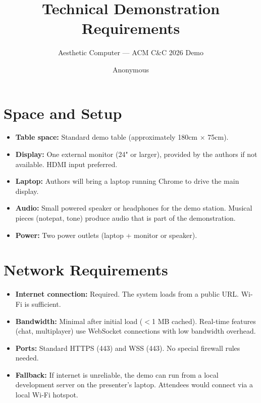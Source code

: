 \documentclass[manuscript,anonymous,review]{acmart}
\begin{document}
\title{Technical Demonstration Requirements}
\subtitle{Aesthetic Computer --- ACM C\&C 2026 Demo}

\author{Anonymous}

\maketitle

\section{Space and Setup}

\begin{itemize}
  \item \textbf{Table space:} Standard demo table (approximately 180cm $\times$ 75cm).
  \item \textbf{Display:} One external monitor (24" or larger), provided by the authors if not available. HDMI input preferred.
  \item \textbf{Laptop:} Authors will bring a laptop running Chrome to drive the main display.
  \item \textbf{Audio:} Small powered speaker or headphones for the demo station. Musical pieces (notepat, tone) produce audio that is part of the demonstration.
  \item \textbf{Power:} Two power outlets (laptop + monitor or speaker).
\end{itemize}

\section{Network Requirements}

\begin{itemize}
  \item \textbf{Internet connection:} Required. The system loads from a public URL. Wi-Fi is sufficient.
  \item \textbf{Bandwidth:} Minimal after initial load ($<$1 MB cached). Real-time features (chat, multiplayer) use WebSocket connections with low bandwidth overhead.
  \item \textbf{Ports:} Standard HTTPS (443) and WSS (443). No special firewall rules needed.
  \item \textbf{Fallback:} If internet is unreliable, the demo can run from a local development server on the presenter's laptop. Attendees would connect via a local Wi-Fi hotspot.
\end{itemize}
\end{document}
